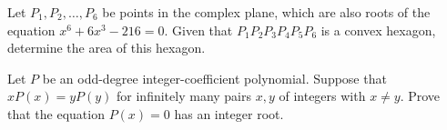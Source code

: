 %	





\begin{question}[name={2016 HMMT, November Theme, \href{https://artofproblemsolving.com/community/c129h1342704p7297971}{Problem 6}}]
	Let $P_1, P_2, \ldots, P_6$ be points in the complex plane, which are also roots of the equation $x^6+6x^3-216=0$. Given that $P_1P_2P_3P_4P_5P_6$ is a convex hexagon, determine the area of this hexagon.	
\end{question}




%	








\begin{question}[name={2016 HMIC, \href{https://artofproblemsolving.com/community/c6h1231860p6230966}{Problem 4}}]
	Let $P$ be an odd-degree integer-coefficient polynomial. Suppose that $xP(x)=yP(y)$ for infinitely many pairs $x,y$ of integers with $x\ne y$. Prove that the equation $P(x)=0$ has an integer root.
\end{question}




